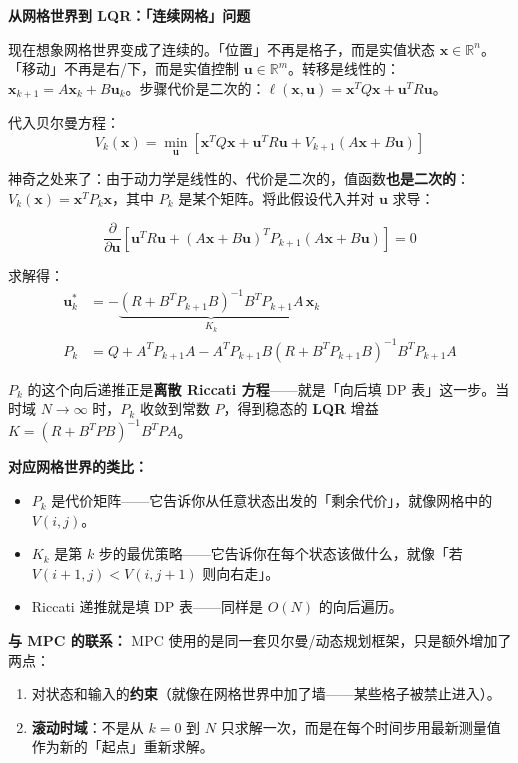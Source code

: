\vspace{0.5em}
\begin{mdframed}[linewidth=1pt, innertopmargin=10pt, innerbottommargin=10pt]
\textbf{从网格世界到 LQR：「连续网格」问题}

\vspace{0.3em}
现在想象网格世界变成了连续的。「位置」不再是格子，而是实值状态 $\mathbf{x} \in \mathbb{R}^n$。「移动」不再是右/下，而是实值控制 $\mathbf{u} \in \mathbb{R}^m$。转移是线性的：$\mathbf{x}_{k+1} = A\mathbf{x}_k + B\mathbf{u}_k$。步骤代价是二次的：$\ell(\mathbf{x}, \mathbf{u}) = \mathbf{x}^T Q \mathbf{x} + \mathbf{u}^T R \mathbf{u}$。

代入贝尔曼方程：
\[
V_k(\mathbf{x}) = \min_{\mathbf{u}} \left[ \mathbf{x}^T Q \mathbf{x} + \mathbf{u}^T R \mathbf{u} + V_{k+1}(A\mathbf{x} + B\mathbf{u}) \right]
\]

神奇之处来了：由于动力学是线性的、代价是二次的，值函数\textbf{也是二次的}：$V_k(\mathbf{x}) = \mathbf{x}^T P_k \mathbf{x}$，其中 $P_k$ 是某个矩阵。将此假设代入并对 $\mathbf{u}$ 求导：

\[
\frac{\partial}{\partial \mathbf{u}} \left[ \mathbf{u}^T R \mathbf{u} + (A\mathbf{x} + B\mathbf{u})^T P_{k+1} (A\mathbf{x} + B\mathbf{u}) \right] = 0
\]

求解得：
\begin{align}
\mathbf{u}_k^* &= -\underbrace{(R + B^T P_{k+1} B)^{-1} B^T P_{k+1} A}_{K_k} \, \mathbf{x}_k \\
P_k &= Q + A^T P_{k+1} A - A^T P_{k+1} B (R + B^T P_{k+1} B)^{-1} B^T P_{k+1} A
\end{align}

$P_k$ 的这个向后递推正是\textbf{离散 Riccati 方程}——就是「向后填 DP 表」这一步。当时域 $N \to \infty$ 时，$P_k$ 收敛到常数 $P$，得到稳态的 \textbf{LQR} 增益 $K = (R + B^T P B)^{-1} B^T P A$。

\textbf{对应网格世界的类比：}
\begin{itemize}[nosep]
    \item $P_k$ 是代价矩阵——它告诉你从任意状态出发的「剩余代价」，就像网格中的 $V(i,j)$。
    \item $K_k$ 是第 $k$ 步的最优策略——它告诉你在每个状态该做什么，就像「若 $V(i+1,j) < V(i,j+1)$ 则向右走」。
    \item Riccati 递推就是填 DP 表——同样是 $O(N)$ 的向后遍历。
\end{itemize}
\end{mdframed}

\textbf{与 MPC 的联系：} MPC 使用的是同一套贝尔曼/动态规划框架，只是额外增加了两点：
\begin{enumerate}
    \item 对状态和输入的\textbf{约束}（就像在网格世界中加了墙——某些格子被禁止进入）。
    \item \textbf{滚动时域}：不是从 $k = 0$ 到 $N$ 只求解一次，而是在每个时间步用最新测量值作为新的「起点」重新求解。
\end{enumerate}


